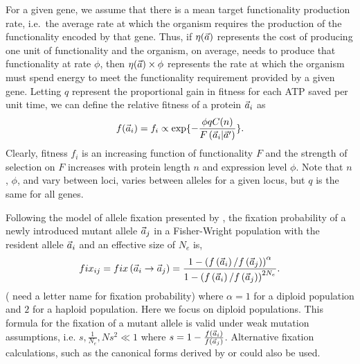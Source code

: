For a given gene, we assume that there is a mean target functionality production rate, i.e.~the average rate at which the organism requires the production of the functionality encoded by that gene.
Thus, if $\eta(\vec{a})$ represents the cost of producing one unit of functionality and the organism, on average, needs to produce that functionality at rate $\phi$, then $\eta(\vec{a}) \times \phi$ represents the rate at which the organism must spend energy to meet the functionality requirement provided by a given gene.
Letting $q$ represent the proportional gain in fitness for each ATP saved per unit time, we can define the relative fitness of a protein $\vec{a}_i$ as
\[
f(\vec{a}_i) = f_i  \propto \exp\{-\frac{\phi q C(n)}{F\left(\vec{a}_i\middle|\vec{a}^\prime\right)}\}.
\]
Clearly, fitness $f_i$ is an increasing function of functionality $F$ and the strength of selection on $F$ increases with protein length $n$ and expression level $\phi$.
Note that $n$, $\phi$, and \avecopt vary between loci, \avec varies between alleles for a given locus, but $q$ is the same for all genes.

Following the model of allele fixation presented by \citet{SellaHirsh2005}, the fixation probability of a newly introduced mutant allele $\vec{a}_j$ in a Fisher-Wright population with the resident allele $\vec{a}_i$ and an effective size of $N_e$ is,
\begin{equation}
fix_{ij} = fix \left(\vec{a}_i \to \vec{a}_j \right) = \frac{1-\left(f\left(\vec{a}_i\right)/f\left(\vec{a}_j\right)\right)^\alpha}{1-\left(f\left(\vec{a}_i\right)/f\left(\vec{a}_j\right)\right)^{2N_e}}.
\label{eq:fixation}
\end{equation}
({\color{blue} need a letter name for fixation probability})
where $\alpha = 1$ for a diploid population and $2$ for a haploid population.
Here we focus on diploid populations.
This formula for the fixation of a mutant allele is valid under weak mutation assumptions, i.e. $s, \frac{1}{N_e}, Ns^2 \ll 1$ where $s=1-\frac{f(\vec{a}_i)}{f(\vec{a}_j)}$.
Alternative fixation calculations, such as the canonical forms derived by \citet{fisher1930theory, wright1931evolution,moran1962statistical} or \citet{kimura1962probability} could also be used. 



